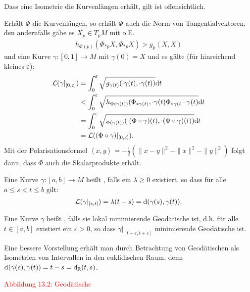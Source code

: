\begin{bew}
  Dass eine Isometrie die Kurvenlängen erhält, gilt ist offensichtlich.

  Erhält $\Phi$ die Kurvenlängen, so erhält $\Phi$ auch die Norm von Tangentialvektoren, den andernfalls gäbe es $X_p \in T_pM$ mit o.E.
  \begin{align*}
    h_{\Phi(p)}(\Phi_{*p}X,\Phi_{*p}X) > g_p(X,X)
  \end{align*}
und eine Kurve $\gamma\colon [0,1] \to M$ mit $\gamma(0) = X$ und es gälte (für hinreichend kleines $\varepsilon$):
\begin{align*}
  \mathcal L(\gamma|_{[0,\varepsilon]}) & = \int_0^{\varepsilon}\sqrt{g_{\gamma(t)}(\cdot\gamma(t),\cdot\gamma(t))}\mathrm{d} t\\
& < \int_0^{\varepsilon}\sqrt{h_{\Phi(\gamma(t))}(\Phi_{*\gamma(t)},\cdot\gamma(t)\Phi_{*\gamma(t}\cdot\gamma(t)}\mathrm{d} t\\
& = \int_0^{\varepsilon}\sqrt{_{\Phi(\gamma(t))}(\cdot{(\Phi \circ \gamma)}(t), \cdot{(\Phi \circ \gamma)}(t))}\mathrm{d} t\\
& = \mathcal L ((\Phi \circ \gamma)|_{[0,\varepsilon]}).
\end{align*}
Mit der Polarisationsformel $\left<x,y\right> = - \frac{1}2 (\|x-y\|^{2} - \|x\|^2-\|y\|^2)$ folgt dann, dass $\Phi$ auch die Skalarprodukte erhält.
\end{bew}

\begin{Dfn}
  Eine Kurve $\gamma \colon [a,b] \to M$ heißt , falls ein $\lambda \geq 0$ existiert, so dass für alle $a \leq s < t \leq b$ gilt:
  \begin{align*}
    \mathcal L(\gamma|_{[s,t]}) = \lambda(t-s) = \mathrm{d}(\gamma(s),\gamma(t)).
  \end{align*}

  Eine Kurve $\gamma$ heißt , falls sie lokal minimierende Geodätische ist, d.h. für alle $t \in [a,b]$ existiert ein $\varepsilon > 0$, so dass $\gamma|_{[t-\varepsilon,t+\varepsilon]}$ minimierende Geodätische ist.
\end{Dfn}

Eine bessere Vorstellung erhält man durch Betrachtung von Geodätischen als Isometrien von Intervallen in den euklidischen Raum, denn $\mathrm{d}(\gamma(s),\gamma(t)) = t-s = \mathrm{d}_{\operatorname{\mathbb{R}}}(t,s)$.

\textcolor{red}{Abbildung 13.2: Geodätische}


